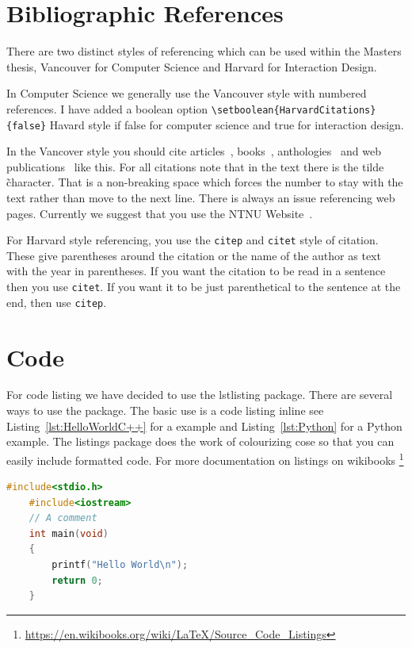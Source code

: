 \section{Bibliographic References}

There are two distinct styles of referencing which can be used within the Masters thesis, Vancouver for Computer Science and Harvard for Interaction Design.

In Computer Science we generally use the Vancouver style with numbered references.  
I have added a boolean option \verb|\setboolean{HarvardCitations}{false}|  Havard style if false for computer science and true for interaction design.
 
In the Vancover style you should cite articles~\cite{Askvall1985}, books~\cite{Card1983},
anthologies~\cite{Lancaster1985} and web publications~\cite{Meldon1997}
like this. For all citations note that in the text there is the tilde \~ character.  
That is a non-breaking space which forces the number to stay with the text rather than move to the next line.
There is always an issue referencing web pages. Currently
we suggest that you use the NTNU Website~\cite{NTNU:Website}.


For Harvard style referencing, you use the \texttt{citep} and \texttt{citet} style of citation. 
These give parentheses around the citation or the name of the author as text with the year in parentheses.  
If you want the citation to be read in a sentence then you use  \texttt{citet}. 
If you want it to be just parenthetical to the sentence at the end, then use \texttt{citep}.

\section{Code}


For code listing we have decided to use the lstlisting package. There are several ways to use the package.  The basic use is a code listing inline see Listing~\ref{lst:HelloWorldC++} for a \CPP example and Listing~\ref{lst:Python} for a Python example. The listings package does the work of colourizing cose so that you can easily include formatted code.   For more documentation on listings on wikibooks \footnote{\url{https://en.wikibooks.org/wiki/LaTeX/Source_Code_Listings}}

\lstset{frameround=tttt}
\lstset{frame=single}
\lstset{xleftmargin=.05\textwidth, xrightmargin=.05\textwidth}

\begin{lstlisting}[language=C++, caption= {Hello World C++ The code listing for Hello World in C++, with colour syntax highlighting.}, label={lst:HelloWorldC++}]
    #include<stdio.h>
    #include<iostream>
    // A comment
    int main(void)
    {
        printf("Hello World\n");
        return 0;
    }
\end{lstlisting}

